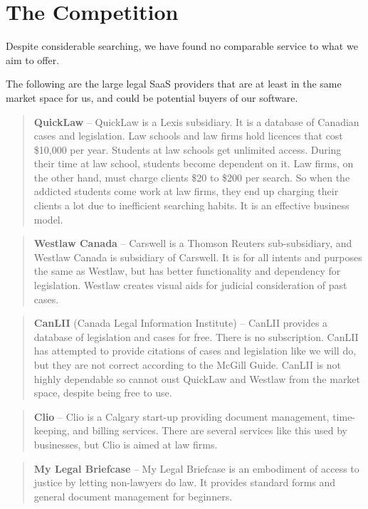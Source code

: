 \documentclass[11pt]{article}
\begin{document}
\section*{The Competition}

Despite considerable searching, we have found no comparable service to what we aim to offer.

The following are the large legal SaaS providers that are at least in the same market space for us, and could be potential buyers of our software.

\begin{quote}
\textbf{QuickLaw} -- QuickLaw is a Lexis subsidiary. It is a database of Canadian cases and legislation. Law schools and law firms hold licences that cost \$10,000 per year. Students at law schools get unlimited access. During their time at law school, students become dependent on it. Law firms, on the other hand, must charge clients \$20 to \$200 per search. So when the addicted students come work at law firms, they end up charging their clients a lot due to inefficient searching habits. It is an effective business model.
\end{quote}

\begin{quote}
\textbf{Westlaw Canada} -- Carswell is a Thomson Reuters sub-subsidiary, and Westlaw Canada is subsidiary of Carswell. It is for all intents and purposes the same as Westlaw, but has better functionality and dependency for legislation. Westlaw creates visual aids for judicial consideration of past cases.
\end{quote}

\begin{quote}
\textbf{CanLII} (Canada Legal Information Institute) -- CanLII provides a database of legislation and cases for free. There is no subscription. CanLII has attempted to provide citations of cases and legislation like we will do, but they are not correct according to the McGill Guide. CanLII is not highly dependable so cannot oust QuickLaw and Westlaw from the market space, despite being free to use.
\end{quote}

\begin{quote}
\textbf{Clio} -- Clio is a Calgary start-up providing document management, time-keeping, and billing services. There are several services like this used by businesses, but Clio is aimed at law firms. 
\end{quote}

\begin{quote}
\textbf{My Legal Briefcase} -- My Legal Briefcase is an embodiment of access to justice by letting non-lawyers do law. It provides standard forms and general document management for beginners. 
\end{quote}
\end{document}
